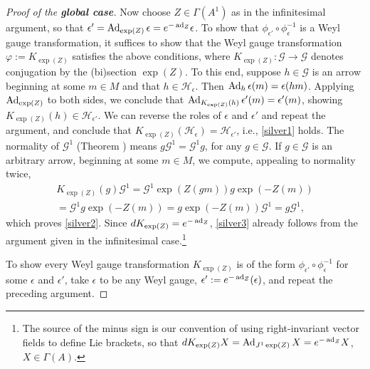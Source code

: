 \documentclass[leqno,12pt]{amsart} %
\begin{document}
\begin{proof}[Proof of the {\bfseries global case}]
  Now choose $Z \in \Gamma(A^1)$ as in the infinitesimal argument, so that
  $\epsilon'=\operatorname{Ad}_{\exp(Z)}\epsilon=e^{-\operatorname{ad}_Z}\epsilon $. To show that
  $\phi_{\epsilon'}\circ \phi_\epsilon^{-1}$ is a Weyl gauge transformation, it suffices
  to show that the Weyl gauge transformation $\varphi :=K_{\exp(Z)}$ satisfies the above
  conditions, where $K_{\exp(Z)}\colon {\mathcal G} \rightarrow {\mathcal G}$ denotes
  conjugation by the (bi)section $\exp(Z)$. To this end, suppose $h \in {\mathcal G} $ is
  an arrow beginning at some $m \in M$ and that $h \in {\mathcal H}_\epsilon$. Then
  $\operatorname{Ad}_h \epsilon(m) = \epsilon(hm)$. Applying $\operatorname{Ad}_{\exp(Z)}$ to both sides, we
  conclude that $\operatorname{Ad}_{K_{\exp(Z)}(h)}\epsilon'(m) = \epsilon'(m)$, showing
  $K_{\exp(Z)}(h) \in {\mathcal H}_{\epsilon'}$. We can reverse the roles of $\epsilon $
  and $\epsilon' $ and repeat the argument, and conclude that
  $K_{\exp(Z)}({\mathcal H}_\epsilon) = {\mathcal H}_{\epsilon'}$, i.e., \eqref{silver1}
  holds. The normality of ${\mathcal G}^1$ (Theorem ) means
  $g {\mathcal G}^1 = {\mathcal G}^1g$, for any $g \in {\mathcal G}$. If
  $g \in {\mathcal G}$ is an arbitrary arrow, beginning at some $m \in M$, we compute,
  appealing to normality twice,
    \begin{multline*}
      K_{\exp(Z)}(g){\mathcal G}^1 =
    {\mathcal G}^1 \exp(Z(gm))g\exp(-Z(m))\\ =
    {\mathcal G}^1 g\exp(-Z(m)) =
    g\exp(-Z(m)){\mathcal G}^1 =
    g{\mathcal G}^1,
  \end{multline*}
  which proves \eqref{silver2}. Since $dK_{\exp(Z)}=e^{-\operatorname{ad}_Z}$, \eqref{silver3}
  already follows from the argument given in the infinitesimal case.\footnote{The source
    of the minus sign is our convention of using right-invariant vector fields to define
    Lie brackets, so that $dK_{\exp(Z)}X=\operatorname{Ad}_{J^1\exp(Z)}X=e^{-\operatorname{ad}_Z}X$,
    $X \in \Gamma(A)$.}

  To show every Weyl gauge transformation $K_{\exp(Z)}$ is of the form
  $\phi_{\epsilon'}\circ \phi_\epsilon^{-1}$ for some $\epsilon $ and $\epsilon'$, take
  $\epsilon $ to be any Weyl gauge, $\epsilon' := e^{-\operatorname{ad}_Z}(\epsilon)$, and repeat
  the preceding argument.
\end{proof}


\end{document}
